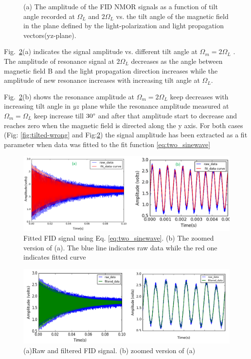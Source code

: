 \begin{figure}
\begin{subfigure}[b]{0.45\textwidth}
        \caption{}
        \label{fig:tilt_x}
    \end{subfigure}
    \caption{(a) The amplitude of the FID NMOR signals as a function
      of tilt angle recorded at $\Omega_L$ and $2\Omega_L$ vs. the
      tilt angle of the magnetic field in the plane defined by the
      light-polarization and light propagation vectors(yz-plane). \label{fig:something-tilted}}
\end{figure}

Fig.~\ref{fig:something-tilted}(a) indicates the signal amplitude vs. different tilt angle at $\Omega_m=2\Omega_L$ . The amplitude of resonance signal at $2\Omega_L$  decreases as the angle between magnetic field B and the light propagation direction increases while the amplitude of new resonance  increases with increasing tilt angle at $\Omega_L$.
      
Fig.~\ref{fig:something-tilted}(b) shows the resonance amplitude at $\Omega_m=2\Omega_L$ keep decreases with increasing tilt angle in $yz$ plane while  the resonance amplitude measured at $\Omega_m=\Omega_L$ keep increase till $30\degree$ and after that amplitude start to decrease and reaches zero when the magnetic field is directed along the y axis. For both cases (Fig: \ref{fig:tilted-wrong} and Fig:\ref{fig:something-tilted}) the signal amplitude has been extracted as a fit parameter when data was fitted to the fit function \ref{eq:two_sinewave}
\begin{figure}[h]
\centering\includegraphics[width=0.9\linewidth]{figures/fitted_data_tilted_field.png}
\caption{ Fitted FID signal using Eq. \ref{eq:two_sinewave}. (b)  The zoomed version of (a). The  blue line indicates raw data while the red one indicates fitted curve}
\end{figure}
\begin{figure}[h]
\centering\includegraphics[width=0.9\linewidth]{figures/filtered_data.png}
\caption{(a)Raw and filtered FID signal. (b) zoomed version of (a)}
\end{figure}

